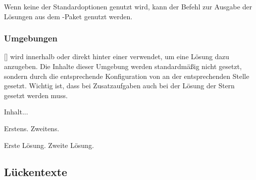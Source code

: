 \begin{commands}
     Wenn keine der Standardoptionen genutzt wird, kann der Befehl zur Ausgabe der Lösungen aus dem -Paket genutzt werden.
\end{commands}

\subsubsection{Umgebungen}
\begin{environments}
    [] wird innerhalb oder direkt hinter einer  verwendet, um eine Lösung dazu anzugeben. Die Inhalte dieser Umgebung werden standardmäßig nicht gesetzt, sondern durch die entsprechende Konfiguration von  an der entsprechenden Stelle gesetzt. Wichtig ist, dass bei Zusatzaufgaben auch bei der Lösung der Stern gesetzt werden muss.

    \begin{sourcecode}[gobble=8]
        \begin{aufgabe}
            Inhalt...
            \begin{teilaufgaben}
                \teilaufgabe Erstens.
                \teilaufgabe[5] Zweitens.
            \end{teilaufgaben}
            \begin{loesung}
                \begin{teilaufgaben}
                    \teilaufgabe Erste Lösung.
                    \teilaufgabe Zweite Lösung.
                \end{teilaufgaben}
            \end{loesung}
        \end{aufgabe}
    \end{sourcecode}
\end{environments}

\subsection{Lückentexte}

